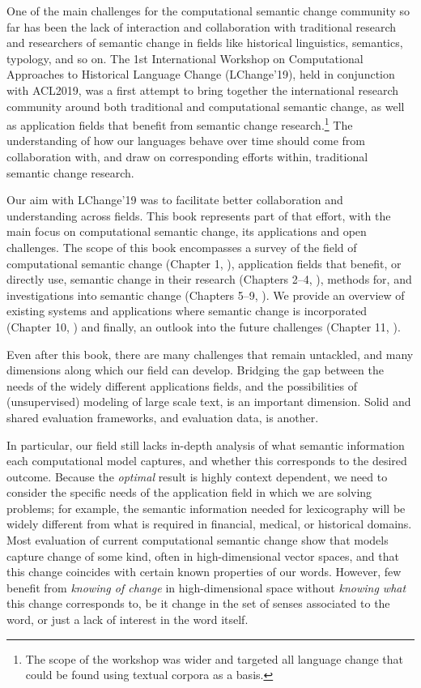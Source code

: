 \begin{refsection}
One of the main challenges for the computational semantic change community so far has been the lack of interaction and collaboration with traditional research and researchers of semantic change in fields like historical linguistics, semantics, typology, and so on. The 1st International Workshop on Computational Approaches to Historical Language Change (LChange'19), held in conjunction with ACL2019, was a first attempt to bring together the international research community around both traditional and computational semantic change, as well as application fields that benefit from semantic change research.\footnote{The scope of the workshop was wider and targeted all language change that could be found using textual corpora as a basis.} The understanding of how our languages behave over time should come from collaboration with, and draw on corresponding efforts within, traditional semantic change research. 

Our aim with LChange'19 was to facilitate better collaboration and understanding across fields. This book represents part of that effort, with the main focus on computational semantic change, its applications and open challenges. The scope of this book encompasses a survey of the field of computational semantic change (Chapter 1, \citealp{chapters/01}),  application fields that benefit, or directly use, semantic change in their research (Chapters 2--4,  \citealp{chapters/04,chapters/05,chapters/x}), methods for, and investigations into semantic change (Chapters 5--9, \citealp{chapters/03,chapters/06,chapters/07,chapters/08,chapters/09}). We provide an overview of existing systems and applications where  semantic change is incorporated (Chapter 10, \citealp{chapters/10}) and finally, an outlook into the future challenges (Chapter 11, \citealp{chapters/11}). 

Even after this book, there are many challenges that remain untackled, and many dimensions along which our field can develop. Bridging the gap between the needs of the widely different applications fields, and the possibilities of (unsupervised) modeling of large scale text, is an important dimension. Solid and shared evaluation frameworks, and evaluation data, is another. 

In particular, our field still lacks in-depth analysis of what semantic information each computational model captures, and whether this corresponds to the desired outcome. 
Because the \textit{optimal} result is highly context dependent, we need to consider the specific needs of the application field in which we are solving problems; for example, the semantic information needed for lexicography will be widely different from what is required in financial, medical, or historical domains. 
Most evaluation of current computational semantic change show that models capture change of some kind, often in high-dimensional vector spaces, and that this change coincides with certain known properties of our words.  However, few benefit from \textit{knowing of change} in high-dimensional space without \textit{knowing what} this change corresponds to, be it change in the set of senses associated to the word, or just a lack of interest in the word itself. 


\end{refsection}
